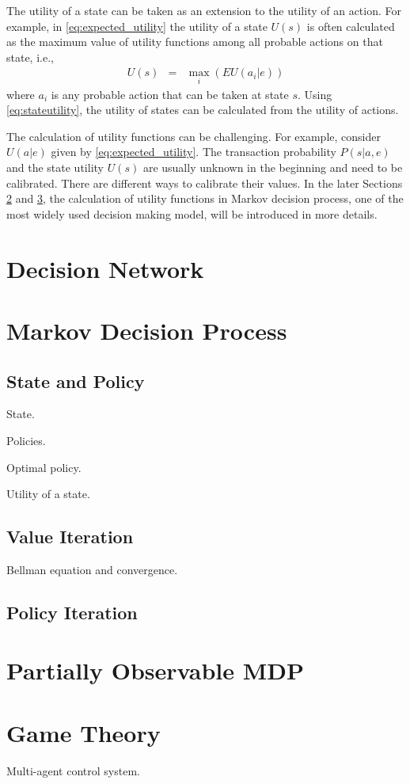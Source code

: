 The utility of a state can be taken as an extension to the utility of an action. For example, in \eqref{eq:expected_utility} the utility of a state $U(s)$ is often calculated as the maximum value of utility functions among all probable actions on that state, i.e.,
\begin{eqnarray}
	U(s) &=& \max_i \left(EU(a_i|e)\right) \label{eq:stateutility}
\end{eqnarray}
where $a_i$ is any probable action that can be taken at state $s$. Using \eqref{eq:stateutility}, the utility of states can be calculated from the utility of actions.


The calculation of utility functions can be challenging. For example, consider $U(a|e)$ given by \eqref{eq:expected_utility}. The transaction probability $P(s|a,e)$ and the state utility $U(s)$ are usually unknown in the beginning and need to be calibrated. There are different ways to calibrate their values. In the later Sections \ref{sec:mdp} and \ref{sec:pomdp}, the calculation of utility functions in Markov decision process, one of the most widely used decision making model, will be introduced in more details.

\section{Decision Network}

\section{Markov Decision Process} \label{sec:mdp}

\subsection{State and Policy}

State.

Policies.

Optimal policy.

Utility of a state.

\subsection{Value Iteration}

Bellman equation and convergence.

\subsection{Policy Iteration}

\section{Partially Observable MDP} \label{sec:pomdp}

\section{Game Theory}

Multi-agent control system.